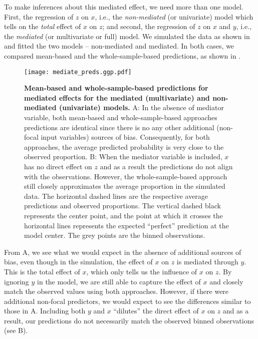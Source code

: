 To make inferences about this mediated effect, we need more than one model. First, the regression of $z$ on $x$, i.e., the \emph{non-mediated} (or univariate) model which tells on the \emph{total} effect of $x$ on $z$; and second, the regression of $z$ on $x$ and $y$, i.e., the \emph{mediated} (or multivariate or full) model. We simulated the data as shown in  and fitted the two models -- non-mediated and mediated. In both cases, we compared mean-based and the whole-sample-based predictions, as shown in .

\begin{figure}
\begin{center}
\texttt{[image: mediate\_preds.ggp.pdf]}
\end{center}
\caption{{\bf Mean-based and whole-sample-based predictions for mediated effects for the mediated (multivariate) and non-mediated (univariate) models.} A: In the absence of mediator variable, both mean-based and whole-sample-based approaches predictions are identical since there is no any other additional (non-focal input variables) sources of bias. Consequently, for both approaches, the average predicted probability is very close to the observed proportion. B: When the mediator variable is included,  $x$ has no direct effect on $z$ and as a result the predictions do not align with the observations. However, the whole-sample-based approach still closely approximates the average proportion in the simulated data. The horizontal dashed lines are the respective average predictions and observed proportions. The vertical dashed black represents the center point, and the point at which it crosses the horizontal lines represents the expected ``perfect'' prediction at the model center. The grey points are the binned observations.}
\label{fig:pred_mediated_plots}
\end{figure}

From A, we see what we would expect in the absence of additional sources of bias, even though in the simulation, the effect of $x$ on $z$ is mediated through $y$. This is the total effect of $x$, which only tells us the influence of $x$ on $z$. By ignoring $y$ in the model, we are still able to capture the effect of $x$ and closely match the observed values using both approaches. However, if there were additional non-focal predictors, we would expect to see the differences similar to those in A. Including both $y$ and $x$ ``dilutes'' the direct effect of $x$ on $z$ and as a result, our predictions do not necessarily match the observed binned observations (see B).

